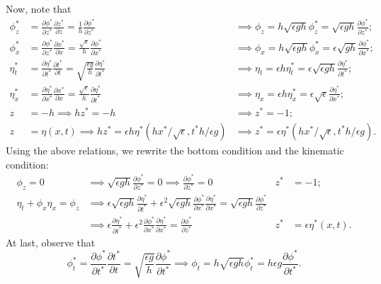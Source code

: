\documentclass[10pt,reqno,oneside,a4paper]{article}
\begin{document}
Now, note that 
\begin{align*}
\phi^*_z &= \frac{\partial \phi^*}{\partial z^*} \frac{\partial z^*}{\partial z} = \frac{1}{h} \frac{\partial \phi^*}{\partial z^*} &\implies \phi_z = h\sqrt{\epsilon g h}\phi^*_z = \sqrt{\epsilon g h} \frac{\partial \phi^*}{\partial z^*}; \\
\phi^*_x &= \frac{\partial \phi^*}{\partial z^*} \frac{\partial x^*}{\partial x} = \frac{\sqrt{\epsilon}}{h} \frac{\partial \phi^*}{\partial x^*} &\implies \phi_x = h\sqrt{\epsilon g h}\phi^*_x = \epsilon\sqrt{g h} \frac{\partial \phi^*}{\partial x^*};\\
\eta^*_t &= \frac{\partial \eta^*}{\partial t^*} \frac{\partial t^*}{\partial t} = \sqrt{\frac{\epsilon g}{h}} \frac{\partial \eta^*}{\partial t^*} &\implies \eta_t = \epsilon h \eta^*_t = \epsilon \sqrt{\epsilon g h} \frac{\partial \eta^*}{\partial t^*};\\
\eta^*_x &= \frac{\partial \eta^*}{\partial x^*} \frac{\partial x^*}{\partial x} = \frac{\sqrt{\epsilon}}{h} \frac{\partial \eta^*}{\partial t^*} &\implies \eta_x = \epsilon h \eta^*_x = \epsilon \sqrt{\epsilon} \frac{\partial \eta^*}{\partial x^*}; \\
z& = -h \implies hz^*= - h &\implies z^* = -1;\\
z& = \eta(x,t) \implies hz^* = \epsilon h \eta^*(hx^*/\sqrt{\epsilon}, t^* h / \epsilon g) &\implies z^* = \epsilon \eta^*(hx^*/\sqrt{\epsilon}, t^* h / \epsilon g).
\end{align*}
Using the above relations, we rewrite the bottom condition and the kinematic condition:
\begin{align*}
\phi_z = 0 &\implies \sqrt{\epsilon g h} \frac{\partial \phi^*}{\partial z^*} = 0 \implies \frac{\partial \phi^*}{\partial z^*} = 0 &z^* &= -1; \\
\eta_t + \phi_x \eta_x = \phi_z &\implies  \epsilon \sqrt{\epsilon g h} \frac{\partial \eta^*}{\partial t^*} + \epsilon^2 \sqrt{\epsilon g h} \frac{\partial \phi^*}{\partial x^*} \frac{\partial \eta^*}{\partial x^*} = \sqrt{\epsilon g h} \frac{\partial \phi^*}{\partial z^*} \\
&\implies  \epsilon \frac{\partial \eta^*}{\partial t^*} + \epsilon^2 \frac{\partial \phi^*}{\partial x^*} \frac{\partial \eta^*}{\partial x^*} =  \frac{\partial \phi^*}{\partial z^*}  &z^* &= \epsilon\eta^*(x,t).
\end{align*}
At last, observe that 
\[ 
\phi^*_t = \frac{\partial \phi^*}{\partial t^*} \frac{\partial t^*}{\partial t} =  \sqrt{\frac{\epsilon g}{h}} \frac{\partial \phi^*}{\partial t^*} \implies \phi_t = h \sqrt{\epsilon g h}\phi^*_t = h\epsilon g \frac{\partial \phi^*}{\partial t^*}.
\]
\end{document}
